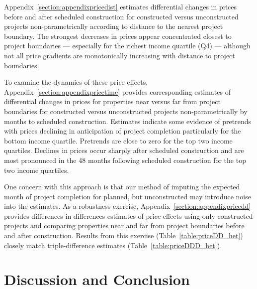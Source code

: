 \documentclass[12pt]{article}
\begin{document}
Appendix~\ref{section:appendixpricedist} estimates differential changes in prices before and after scheduled construction for constructed versus unconstructed projects non-parametrically according to distance to the nearest project boundary.  The strongest decreases in prices appear concentrated closest to project boundaries --- especially for the richest income quartile (Q4) --- although not all price gradients are monotonically increasing with distance to project boundaries.  

To examine the dynamics of these price effects, Appendix~\ref{section:appendixpricetime} provides corresponding estimates of differential changes in prices for properties near versus far from project boundaries for constructed versus unconstructed projects non-parametrically by months to scheduled construction.  Estimates indicate some evidence of pretrends with prices declining in anticipation of project completion particularly for the bottom income quartile.  Pretrends are close to zero for the top two income quartiles.  Declines in prices occur sharply after scheduled construction and are most pronounced in the 48 months following scheduled construction for the top two income quartiles.

One concern with this approach is that our method of imputing the expected month of project completion for planned, but unconstructed  may introduce noise into the estimates.  As a robustness exercise, Appendix~\ref{section:appendixpricedd} provides differences-in-differences estimates of price effects using only constructed projects and comparing properties near and far from project boundaries before and after construction.  Results from this exercise (Table~\ref{table:priceDD_het}) closely match triple-difference estimates (Table~\ref{table:priceDDD_het}).




\section{Discussion and Conclusion}\label{section:discussion}
\end{document}
